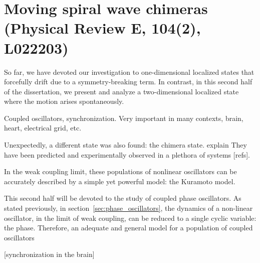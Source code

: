 \chapter{Moving spiral wave chimeras (Physical Review E, 104(2), L022203)}

So far, we have devoted our investigation to one-dimensional localized states
that forcefully drift due to a symmetry-breaking term. In contrast, in this
second half of the dissertation, we present and analyze a two-dimensional 
localized state where the motion arises spontaneously.

Coupled oscillators, synchronization. Very important in many contexts, brain, heart,
electrical grid, etc.

Unexpectedly, a different state was also found: the chimera state. explain
They have been predicted and experimentally observed in a plethora of systems
[refs]. 

In the weak coupling limit, these populations of nonlinear oscillators can be accurately
described by a simple yet powerful model: the Kuramoto model. 


This second half will be devoted to the study of coupled phase oscillators. As
stated previously, in section~\ref{sec:phase_oscillators}, the dynamics of
a non-linear oscillator, in the limit of weak coupling, can be reduced
to a single cyclic variable: the phase. Therefore, an adequate and general model
for a population of coupled oscillators  

[synchronization in the brain] \cite{erra2017neuralsynchronization}


